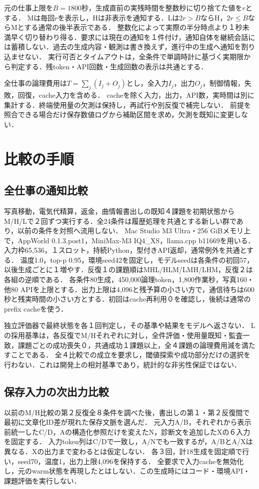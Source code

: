 \documentclass[letter]{ieicej}
\begin{document}
元の仕事上限を$B=1800$秒，生成直前の実残時間を整数秒に切り捨てた値を$r$とする．
Mは毎回$r$を表示し，Hは非表示を通知する．Lは$2r>B$ならH，$2r\leq B$ならMとする通常の後半表示である．
整数化によって実際の半分時点より１秒未満早く切り替わり得る．要求には現在の通知を１件付け，通知自体を継続会話には蓄積しない．過去の生成内容・観測は書き換えず，進行中の生成へ通知を割り込ませない．
実行可否とタイムアウトは，全条件で単調時計に基づく実期限から判定する．残token・API回数・生成回数の表示は共通とする．

全仕事の論理費用は$T=\sum_j(I_j+O_j)$とし，全入力$I_j$，出力$O_j$，制御情報，失敗，回復，cache入力を含める．
cacheを除く入力，出力，API数，実時間は別に集計する．終端使用量の欠測は保持し，再試行や別反復で補完しない．
前提を照合できる場合だけ保存数値ログから補助区間を求め，欠測を既知に変更しない．

\section{比較の手順}
\subsection{全仕事の通知比較}
写真移動，電気代精算，返金，曲情報書出しの既知４課題を初期状態からM/H/Lで２回ずつ実行する．全24条件は履歴処理を共通とする新しい群であり，以前の条件を対照へ流用しない．
Mac Studio M3 Ultra・256 GiBメモリ上で，AppWorld 0.1.3.post1，MiniMax-M3 IQ4\_XS，llama.cpp b11669を用いる．入力枠65,536，１スロット，持続Python，型付きAPI返却，通常例外を共通とする．
温度1.0，top-p 0.95，環境seed42を固定し，モデルseedは各条件の初回57，以後生成ごとに１増やす．反復１の課題順はMHL/HLM/LMH/LHM，反復２は各組の逆順である．
各条件80生成，450,000論理token，1,800作業秒，写真160・他80 APIを上限とする．出力上限は4,096と残予算の小さい方で，通信待ちは600秒と残実時間の小さい方とする．初回はcache再利用０を確認し，後続は通常のprefix cacheを使う．

独立評価器で最終状態を各１回判定し，その基準や結果をモデルへ返さない．
Lの採用基準は，各反復でM/Hそれぞれに対し，全件評価・使用量既知・監査一致，課題ごとの成功喪失０，共通成功１課題以上，全４課題の論理費用減を満たすことである．
全４比較での成立を要求し，閾値探索や成功部分だけの選択を行わない．これは開発上の相対基準であり，統計的な非劣性保証ではない．

\subsection{保存入力の次出力比較}
以前のM/H比較の第２反復全８条件を調べた後，書出しの第１・第２反復間で最初に文章化ID差が現れた保存文脈を選んだ．
元入力A/B，それぞれから表示前統一したC/D，Aの構造化参照だけを変えたN，診断文を追加したXの６入力を固定する．
入力token列はC/Dで一致し，A/Nでも一致するが，A/BとA/Xは異なる．Xの出力まで変わるとは仮定しない．
各３回，計18生成を固定順で行い，seed70，温度1，出力上限4,096を保持する．
全要求で入力cacheを無効化し，元のwarm状態を再現したとはしない．この生成時にはコード・環境API・課題評価を実行しない．
\end{document}
